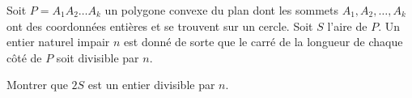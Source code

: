 Soit $P = A_1A_2\ldots A_k$ un polygone convexe du plan dont les sommets $A_1, A_2, \ldots, A_k$ ont des
coordonnées entières et se trouvent sur un cercle. Soit $S$ l'aire de $P$. Un entier naturel impair $n$ est
donné de sorte que le carré de la longueur de chaque côté de $P$ soit divisible par $n$.

Montrer que $2S$ est un entier divisible par $n$.
